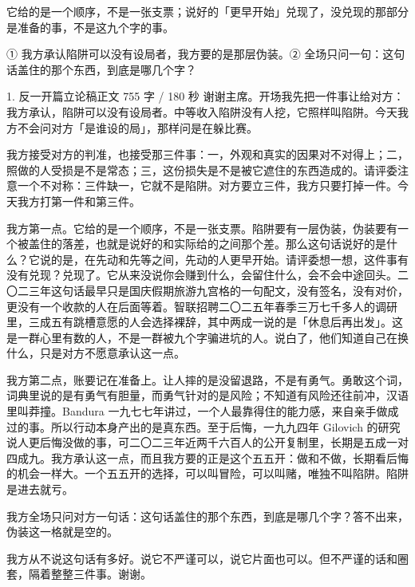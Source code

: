 \documentclass[script,con]{debate}
\begin{document}
\debatetitle
\begin{thesisbox}[全场一句话立论]它给的是一个顺序，不是一张支票；说好的「更早开始」兑现了，没兑现的那部分是准备的事，不是这九个字的事。\end{thesisbox}
\begin{thesisbox}[全场只守两句话]① 我方承认陷阱可以没有设局者，我方要的是那层伪装。② 全场只问一句：这句话盖住的那个东西，到底是哪几个字？\end{thesisbox}

\begin{speech}{1. 反一开篇立论稿}{正文 755 字 / 180 秒}
谢谢主席。开场我先把一件事让给对方：我方承认，陷阱可以没有设局者。中等收入陷阱没有人挖，它照样叫陷阱。今天我方不会问对方「是谁设的局」，那样问是在躲比赛。

我方接受对方的判准，也接受那三件事：一，外观和真实的因果对不对得上；二，照做的人受损是不是常态；三，这份损失是不是被它遮住的东西造成的。请评委注意一个不对称：三件缺一，它就不是陷阱。对方要立三件，我方只要打掉一件。今天我方打第一件和第三件。

我方第一点。它给的是一个顺序，不是一张支票。陷阱要有一层伪装，伪装要有一个被盖住的落差，也就是说好的和实际给的之间那个差。那么这句话说好的是什么？它说的是，在先动和先等之间，先动的人更早开始。请评委想一想，这件事有没有兑现？兑现了。它从来没说你会赚到什么，会留住什么，会不会中途回头。二〇二三年这句话最早只是国庆假期旅游九宫格的一句配文，没有签名，没有对价，更没有一个收款的人在后面等着。智联招聘二〇二五年春季三万七千多人的调研里，三成五有跳槽意愿的人会选择裸辞，其中两成一说的是「休息后再出发」。这是一群心里有数的人，不是一群被九个字骗进坑的人。说白了，他们知道自己在换什么，只是对方不愿意承认这一点。

我方第二点，账要记在准备上。让人摔的是没留退路，不是有勇气。勇敢这个词，词典里说的是有勇气有胆量，而勇气针对的是风险；不知道有风险还往前冲，汉语里叫莽撞。Bandura 一九七七年讲过，一个人最靠得住的能力感，来自亲手做成过的事。所以行动本身产出的是真东西。至于后悔，一九九四年 Gilovich 的研究说人更后悔没做的事，可二〇二三年近两千六百人的公开复制里，长期是五成一对四成九。我方承认这一点，而且我方要的正是这个五五开：做和不做，长期看后悔的机会一样大。一个五五开的选择，可以叫冒险，可以叫赌，唯独不叫陷阱。陷阱是进去就亏。

我方全场只问对方一句话：这句话盖住的那个东西，到底是哪几个字？答不出来，伪装这一格就是空的。

我方从不说这句话有多好。说它不严谨可以，说它片面也可以。但不严谨的话和圈套，隔着整整三件事。谢谢。
\end{speech}
\begin{contingency}
\end{contingency}
\end{document}
